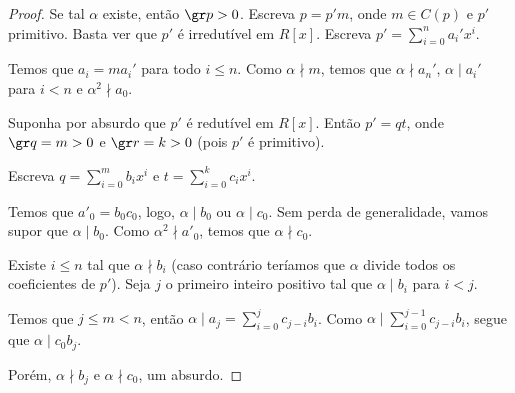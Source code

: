     \begin{proof}
        Se tal $\alpha$ existe, então $\gr p>0$.
        Escreva $p=p'm$, onde $m \in C(p)$ e $p'$ primitivo. Basta ver que $p'$ é irredutível em $R[x]$.
        Escreva $p'=\sum_{i=0}^n a_i' x^i$.
        
        Temos que $a_i=m a_i'$ para todo $i\leq n$. Como $\alpha \nmid m$, temos que  $\alpha\nmid a_n'$, $\alpha\mid a_i'$ para $i<n$ e $\alpha^2 \nmid a_0$.

        Suponha por absurdo que $p'$ é redutível em $R[x]$.
        Então $p'=qt$, onde $\gr q=m>0$ e $\gr r=k>0$  (pois $p'$ é primitivo).

        Escreva $q=\sum_{i=0}^m b_i x^i$ e $t=\sum_{i=0}^k c_i x^i$.

        Temos que $a'_0=b_0c_0$, logo, $\alpha \mid b_0$ ou $\alpha \mid c_0$. Sem perda de generalidade, vamos supor que $\alpha \mid b_0$. Como $\alpha^2\nmid {a'_0}$, temos que $\alpha \nmid c_0$.

        Existe $i\leq n$ tal que $\alpha \nmid b_i$ (caso contrário teríamos que $\alpha$ divide todos os coeficientes de $p'$). Seja $j$ o primeiro inteiro positivo tal que $\alpha\mid b_i$ para $i<j$.

        Temos que $j\leq m<n$, então $\alpha\mid a_j=\sum_{i=0}^j c_{j-i}b_i$. Como $\alpha\mid \sum_{i=0}^{j-1} c_{j-i}b_i$, segue que $\alpha\mid c_0 b_j$.
        
        Porém, $\alpha \nmid b_j$ e $\alpha \nmid c_0$, um absurdo.
    \end{proof}
